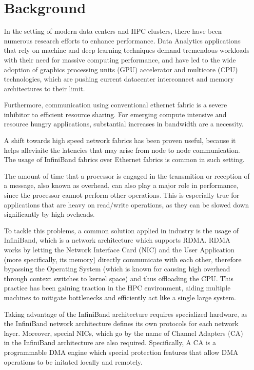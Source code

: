 \section{Background}

In the setting of modern data centers and HPC clusters, there have been numerous research efforts
to enhance performance. Data Analytics applications that rely on machine and deep learning techniques demand
tremendous workloads with their need for massive computing performance, and have led to the wide adoption of graphics
processing units (GPU) accelerator and multicore (CPU) technologies, which are pushing current datacenter interconnect
and memory architectures to their limit\cite{shalf19}.

Furthermore, communication using conventional ethernet fabric is a severe inhibitor to efficient resource sharing.
For emerging compute intensive and resource hungry applications, substantial increases in bandwidth are a necessity\cite{shalf19}.

A shift towards high speed network fabrics has been proven useful,
because it helps alleviaite the latencies that may arise from node to node communication.
The usage of InfiniBand fabrics over Ethernet fabrics is common in such setting.

The amount of time that a processor is engaged in the transmition or reception of a message, also known as overhead,
can also play a major role in performance, since the processor cannot perform other operations.
This is especially true for applications that are heavy on read/write operations, as they can
be slowed down significantly by high oveheads.\cite{martin97}

To tackle this problems, a common solution applied in industry is the usage of InfiniBand, which
is a network architecture which supports RDMA.
RDMA works by letting the Network Interface Card (NIC) and the User Application (more specifically, its memory)
directly communicate with each other, therefore bypassing the Operating System (which is known for
causing high overhead through context switches to kernel space) and thus offloading the CPU. This practice has been
gaining traction in the HPC environment, aiding multiple machines to mitigate bottlenecks and efficiently act like a
single large system.

Taking advantage of the InfiniBand architecture requires specialized hardware, as the InfiniBand network architecture defines
its own protocols for each network layer. Moreover, special NICs, which go by the name of Channel Adapters (CA) in the InfiniBand
architecture are also required. Specifically, A CA is a programmable DMA engine which special protection features that allow
DMA operations to be initated locally and remotely\cite{infinibandvol107}.



